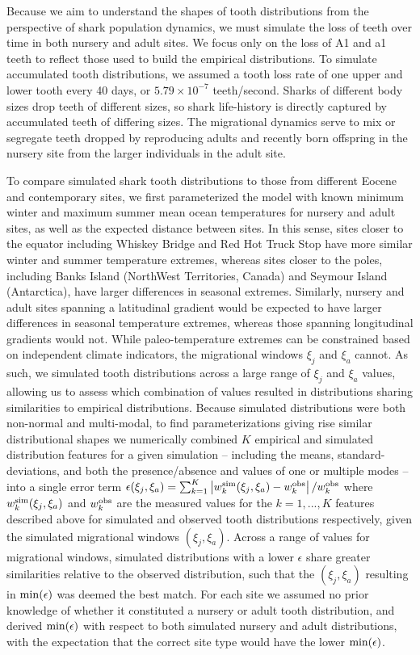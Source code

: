 \documentclass[]{rsos}%
\begin{document}
Because we aim to understand the shapes of tooth distributions from the perspective of shark population dynamics, we must simulate the loss of teeth over time in both nursery and adult sites.
We focus only on the loss of A1 and a1 teeth to reflect those used to build the empirical distributions.
To simulate accumulated tooth distributions, we assumed a tooth loss rate of one upper and lower tooth every 40 days, or $5.79\times 10^{-7}$ teeth/second.
Sharks of different body sizes drop teeth of different sizes, so shark life-history is directly captured by accumulated teeth of differing sizes.
The migrational dynamics serve to mix or segregate teeth dropped by reproducing adults and recently born offspring in the nursery site from the larger individuals in the adult site.


To compare simulated shark tooth distributions to those from different Eocene and contemporary sites, we first parameterized the model with known minimum winter and maximum summer mean ocean temperatures for nursery and adult sites, as well as the expected distance between sites.
In this sense, sites closer to the equator including Whiskey Bridge and Red Hot Truck Stop have more similar winter and summer temperature extremes, whereas sites closer to the poles, including Banks Island (NorthWest Territories, Canada) and Seymour Island (Antarctica), have larger differences in seasonal extremes.
Similarly, nursery and adult sites spanning a latitudinal gradient would be expected to have larger differences in seasonal temperature extremes, whereas those spanning longitudinal gradients would not.
While paleo-temperature extremes can be constrained based on independent climate indicators, the migrational windows $\xi_j$ and $\xi_a$ cannot.
As such, we simulated tooth distributions across a large range of $\xi_j$ and $\xi_a$ values, allowing us to assess which combination of values resulted in distributions sharing similarities to empirical distributions.
Because simulated distributions were both non-normal and multi-modal, to find parameterizations giving rise similar distributional shapes we numerically combined $K$ empirical and simulated distribution features for a given simulation -- including the means, standard-deviations, and both the presence/absence and values of one or multiple modes -- into a single error term $\epsilon(\xi_j,\xi_a) = \sum_{k=1}^K \left| w^{\rm sim}_k(\xi_j,\xi_a) - w^{\rm obs}_k \right|/w^{\rm obs}_k$ where $w^{\rm sim}_k(\xi_j,\xi_a)$ and $w^{\rm obs}_k$ are the measured values for the $k=1,...,K$ features described above for simulated and observed tooth distributions respectively, given the simulated migrational windows $(\xi_j,\xi_a)$.
Across a range of values for migrational windows, simulated distributions with a lower $\epsilon$ share greater similarities relative to the observed distribution, such that the $(\xi_j,\xi_a)$ resulting in ${\rm min}(\epsilon)$ was deemed the best match.
For each site we assumed no prior knowledge of whether it constituted a nursery or adult tooth distribution, and derived ${\rm min}(\epsilon)$ with respect to both simulated nursery and adult distributions, with the expectation that the correct site type would have the lower ${\rm min}(\epsilon)$.
\end{document}
